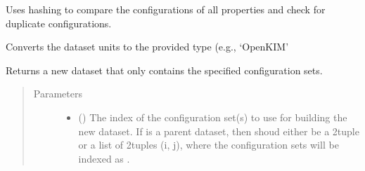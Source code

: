 \documentclass[letterpaper,10pt,english]{sphinxmanual}
\begin{document}
\begin{fulllineitems}
\begin{fulllineitems}
\label{\detokenize{dataset:colabfit.tools.dataset.Dataset.clean}}
\sphinxAtStartPar
Uses hashing to compare the configurations of all properties and check
for duplicate configurations.

\end{fulllineitems}


\begin{fulllineitems}
\label{\detokenize{dataset:colabfit.tools.dataset.Dataset.convert_units}}
\sphinxAtStartPar
Converts the dataset units to the provided type (e.g., ‘OpenKIM’

\end{fulllineitems}


\begin{fulllineitems}
\label{\detokenize{dataset:colabfit.tools.dataset.Dataset.dataset_from_config_sets}}
\sphinxAtStartPar
Returns a new dataset that only contains the specified configuration
sets.
\begin{quote}\begin{description}
\item[{Parameters}] \leavevmode\begin{itemize}
\item {} 
\sphinxAtStartPar
{} () \textendash{} The index of the configuration set(s) to use for building the
new dataset. If  is a parent dataset, then  shoud
either be a 2\sphinxhyphen{}tuple or a list of 2\sphinxhyphen{}tuples (i, j), where the
configuration sets will be indexed as
.


\end{itemize}
\end{description}
\end{quote}
\end{fulllineitems}
\end{fulllineitems}
\end{document}
